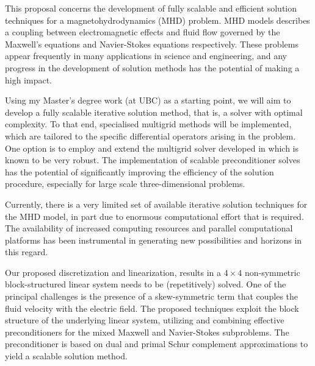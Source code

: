\documentclass[12pt]{article}
\numberwithin{equation}{section}    %
\begin{document}
\pagestyle{fancyplain}
\fancyhead{}
\fancyfoot{} %
\fancyfoot[LE,RO]{\thepage \hspace{-5mm}}
\fancyfoot[CO,RE]{}

{}

\bigskip



This proposal concerns the development of fully scalable and efficient solution techniques for a magnetohydrodynamics (MHD) problem. MHD models describes a coupling between electromagnetic effects and fluid flow governed by the  Maxwell’s equations and Navier-Stokes equations respectively. These problems appear frequently in many applications in science and engineering, and any progress in the development of solution methods has the potential of making a high impact.

\smallskip

Using my Master's degree work (at UBC) as a starting point, we will aim to develop a fully scalable iterative solution method, that is, a solver with optimal complexity. To that end, specialised multigrid methods will be implemented, which are tailored to the specific differential operators arising in the problem. One option is to employ and extend the multigrid solver developed in \cite{hiptmair2007nodal} {which is known to be very robust}. The implementation of scalable preconditioner solves has the potential of significantly improving the efficiency of the solution procedure, especially for large scale three-dimensional problems.
\smallskip


Currently, there is a very limited set of available iterative solution techniques for the MHD model, in part due to enormous computational effort that is required. The availability of increased computing resources and parallel computational platforms has been instrumental in generating new possibilities and horizons in this regard.

\smallskip

Our proposed discretization and linearization, results in a $4\times4$ non-symmetric block-structured linear system needs to be (repetitively) solved. One of the principal challenges is the presence of a skew-symmetric term that couples the fluid velocity with the electric field. The proposed techniques  exploit the block structure of the underlying linear system, utilizing and combining effective preconditioners for the mixed Maxwell and Navier-Stokes subproblems. The preconditioner is based on dual and primal Schur complement approximations to yield a scalable solution method. 
\end{document}
